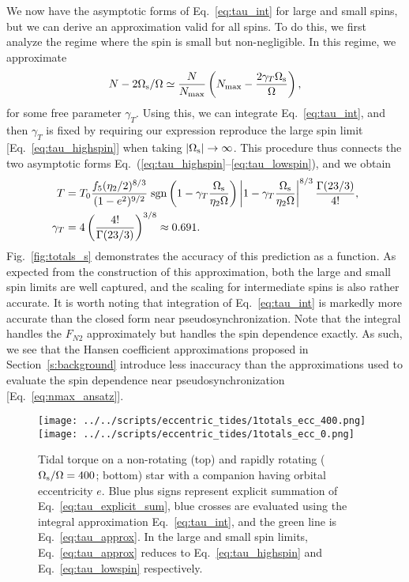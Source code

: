 \documentclass[
        fleqn,
        usenatbib,
    ]{mnras}
\newcommand*{\abs}[1]{\left|#1\right|}
\newcommand*{\p}[1]{\left(#1\right)}
\begin{document}
We now have the asymptotic forms of Eq.~\eqref{eq:tau_int} for large and small
spins, but we can derive an approximation valid for all spins. To do this, we
first analyze the regime where the spin is small but non-negligible. In this
regime, we approximate
\begin{equation}
    N - 2\Omega_{\rm s} / \Omega \simeq \frac{N}{N_{\max}}
        \left(N_{\max} - \frac{2\gamma_T
        \Omega_{\rm s}}{\Omega}\right)\label{eq:nmax_ansatz},
\end{equation}
for some free parameter $\gamma_T$. Using this, we can integrate
Eq.~\eqref{eq:tau_int}, and then $\gamma_T$ is fixed by requiring our
expression reproduce the large spin limit [Eq.~\eqref{eq:tau_highspin}] when
taking $\abs{\Omega_{\rm s}} \to \infty$. This procedure thus connects the two
asymptotic forms Eq.~(\ref{eq:tau_highspin}--\ref{eq:tau_lowspin}), and we
obtain
\begin{align}
    T &= T_0 \frac{f_5 (\eta_2/2)^{8/3}}{(1 - e^2)^{9/2}}
        \;\mathrm{sgn}\left(1 - \gamma_T\frac{\Omega_{\rm s}}{\eta_2\Omega}\right)
            \left|1 - \gamma_T\frac{\Omega_{\rm s}}{\eta_2\Omega}\right|^{8/3}
            \frac{\Gamma(23/3)}{4!},\label{eq:tau_approx}\\
    \gamma_T &= 4\p{\frac{4!}{\Gamma(23/3)}}^{3/8} \approx 0.691.
\end{align}
Fig.~\ref{fig:totals_s} demonstrates the accuracy of
this prediction as a function. As expected from the construction of this approximation, both
the large and small spin limits are well captured, and the scaling for
intermediate spins is also rather accurate. It is worth noting that integration
of Eq.~\eqref{eq:tau_int} is markedly more accurate than the closed form near
pseudosynchronization. Note that the integral handles the $F_{N2}$
approximately but handles the spin dependence exactly. As such, we see that the
Hansen coefficient approximations proposed in Section~\ref{s:background}
introduce less inaccuracy than the approximations used to evaluate the spin
dependence near pseudosynchronization [Eq.~\eqref{eq:nmax_ansatz}].
\begin{figure}
    \centering
    \texttt{[image: ../../scripts/eccentric\_tides/1totals\_ecc\_400.png]}
    \texttt{[image: ../../scripts/eccentric\_tides/1totals\_ecc\_0.png]}
    \caption{Tidal torque on a non-rotating (top) and rapidly rotating
    ($\Omega_{\rm s} / \Omega = 400$; bottom) star with a companion having
    orbital eccentricity $e$. Blue plus signs represent explicit summation of
    Eq.~\eqref{eq:tau_explicit_sum}, blue crosses are evaluated using the
    integral approximation Eq.~\eqref{eq:tau_int}, and the green line is
    Eq.~\eqref{eq:tau_approx}. In the large and small spin limits,
    Eq.~\eqref{eq:tau_approx} reduces to Eq.~\eqref{eq:tau_highspin} and
    Eq.~\eqref{eq:tau_lowspin} respectively. }\label{fig:totals_ecc0}
\end{figure}
\end{document}
